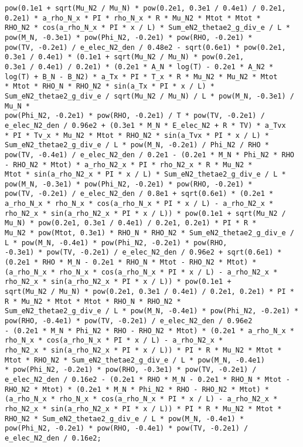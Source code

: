 \documentclass[10pt]{article}
\begin{document}
\begin{scriptsize}
\begin{verbatim}
pow(0.1e1 + sqrt(Mu_N2 / Mu_N) * pow(0.2e1, 0.3e1 / 0.4e1) / 0.2e1, 0.2e1) * a_rho_N_x * PI * rho_N_x * R * Mu_N2 * Mtot * Mtot *
RHO_N2 * cos(a_rho_N_x * PI * x / L) * Sum_eN2_thetae2_g_div_e / L * pow(M_N, -0.3e1) * pow(Phi_N2, -0.2e1) * pow(RHO, -0.2e1) *
pow(TV, -0.2e1) / e_elec_N2_den / 0.48e2 - sqrt(0.6e1) * pow(0.2e1, 0.3e1 / 0.4e1) * (0.1e1 + sqrt(Mu_N2 / Mu_N) * pow(0.2e1,
0.3e1 / 0.4e1) / 0.2e1) * (0.2e1 * A_N * log(T) - 0.2e1 * A_N2 * log(T) + B_N - B_N2) * a_Tx * PI * T_x * R * Mu_N2 * Mu_N2 * Mtot
* Mtot * RHO_N * RHO_N2 * sin(a_Tx * PI * x / L) * Sum_eN2_thetae2_g_div_e / sqrt(Mu_N2 / Mu_N) / L * pow(M_N, -0.3e1) / Mu_N *
pow(Phi_N2, -0.2e1) * pow(RHO, -0.2e1) / T * pow(TV, -0.2e1) / e_elec_N2_den / 0.96e2 + (0.3e1 * M_N * E_elec_N2 + R * TV) * a_Tvx
* PI * Tv_x * Mu_N2 * Mtot * RHO_N2 * sin(a_Tvx * PI * x / L) * Sum_eN2_thetae2_g_div_e / L * pow(M_N, -0.2e1) / Phi_N2 / RHO *
pow(TV, -0.4e1) / e_elec_N2_den / 0.2e1 - (0.2e1 * M_N * Phi_N2 * RHO - RHO_N2 * Mtot) * a_rho_N2_x * PI * rho_N2_x * R * Mu_N2 *
Mtot * sin(a_rho_N2_x * PI * x / L) * Sum_eN2_thetae2_g_div_e / L * pow(M_N, -0.3e1) * pow(Phi_N2, -0.2e1) * pow(RHO, -0.2e1) *
pow(TV, -0.2e1) / e_elec_N2_den / 0.8e1 + sqrt(0.6e1) * (0.2e1 * a_rho_N_x * rho_N_x * cos(a_rho_N_x * PI * x / L) - a_rho_N2_x *
rho_N2_x * sin(a_rho_N2_x * PI * x / L)) * pow(0.1e1 + sqrt(Mu_N2 / Mu_N) * pow(0.2e1, 0.3e1 / 0.4e1) / 0.2e1, 0.2e1) * PI * R *
Mu_N2 * pow(Mtot, 0.3e1) * RHO_N * RHO_N2 * Sum_eN2_thetae2_g_div_e / L * pow(M_N, -0.4e1) * pow(Phi_N2, -0.2e1) * pow(RHO,
-0.3e1) * pow(TV, -0.2e1) / e_elec_N2_den / 0.96e2 + sqrt(0.6e1) * (0.2e1 * RHO * M_N - 0.2e1 * RHO_N * Mtot - RHO_N2 * Mtot) *
(a_rho_N_x * rho_N_x * cos(a_rho_N_x * PI * x / L) - a_rho_N2_x * rho_N2_x * sin(a_rho_N2_x * PI * x / L)) * pow(0.1e1 +
sqrt(Mu_N2 / Mu_N) * pow(0.2e1, 0.3e1 / 0.4e1) / 0.2e1, 0.2e1) * PI * R * Mu_N2 * Mtot * Mtot * RHO_N * RHO_N2 *
Sum_eN2_thetae2_g_div_e / L * pow(M_N, -0.4e1) * pow(Phi_N2, -0.2e1) * pow(RHO, -0.4e1) * pow(TV, -0.2e1) / e_elec_N2_den / 0.96e2
- (0.2e1 * M_N * Phi_N2 * RHO - RHO_N2 * Mtot) * (0.2e1 * a_rho_N_x * rho_N_x * cos(a_rho_N_x * PI * x / L) - a_rho_N2_x *
rho_N2_x * sin(a_rho_N2_x * PI * x / L)) * PI * R * Mu_N2 * Mtot * Mtot * RHO_N2 * Sum_eN2_thetae2_g_div_e / L * pow(M_N, -0.4e1)
* pow(Phi_N2, -0.2e1) * pow(RHO, -0.3e1) * pow(TV, -0.2e1) / e_elec_N2_den / 0.16e2 - (0.2e1 * RHO * M_N - 0.2e1 * RHO_N * Mtot -
RHO_N2 * Mtot) * (0.2e1 * M_N * Phi_N2 * RHO - RHO_N2 * Mtot) * (a_rho_N_x * rho_N_x * cos(a_rho_N_x * PI * x / L) - a_rho_N2_x *
rho_N2_x * sin(a_rho_N2_x * PI * x / L)) * PI * R * Mu_N2 * Mtot * RHO_N2 * Sum_eN2_thetae2_g_div_e / L * pow(M_N, -0.4e1) *
pow(Phi_N2, -0.2e1) * pow(RHO, -0.4e1) * pow(TV, -0.2e1) / e_elec_N2_den / 0.16e2;


\end{verbatim}
\end{scriptsize}
\end{document}
